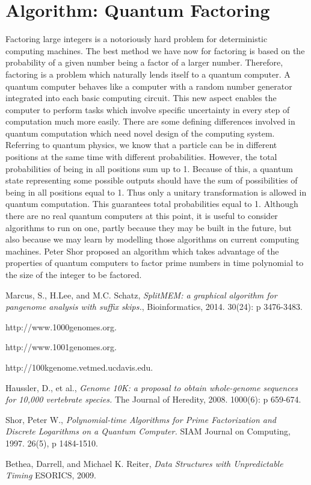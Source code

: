 \documentclass[11pt]{article}
\begin{document}
\section{Algorithm: Quantum Factoring}
Factoring large  integers is a notoriously hard problem for deterministic 
computing machines. The best method we have now  for factoring is based 
on the probability of a given number being a factor of a larger number. 
Therefore, factoring is a problem which naturally lends itself to a
quantum computer. A quantum computer behaves like a computer with a 
random number generator integrated into each basic computing circuit.
This new aspect enables the computer to perform tasks which involve 
specific uncertainty in every step of computation much more easily.
There are some defining differences involved in quantum computation
which need novel design of the computing system. Referring to quantum
physics, we know that a particle can be in 
different positions at the same time with different probabilities. 
However, the total probabilities of being in all positions sum up to 1. 
Because of this, a quantum state representing some possible outputs
should have the sum of possibilities of being in all positions equal to
1. Thus only a unitary transformation is allowed in quantum computation.
This guarantees total probabilities equal to 1. Although there are no
real quantum computers at this point, it is useful to consider algorithms
to run on one, partly because they may be built in the future, but also
because we may learn by modelling those algorithms on current computing machines.
Peter Shor proposed an algorithm which takes advantage of the properties
of quantum computers to factor prime numbers in time polynomial to the
size of the integer to be factored\cite{Shor97}.

\pagebreak

\begin{thebibliography}{9}

  Marcus, S., H.Lee, and M.C. Schatz,
  \emph{SplitMEM: a graphical algorithm for pangenome analysis with suffix skips.},
  Bioinformatics,
  2014. 30(24): p 3476-3483.
  
	http://www.1000genomes.org.
	
	http://www.1001genomes.org.
	
	http://100kgenome.vetmed.ucdavis.edu.
	
	Haussler, D., et al.,
	\emph{Genome 10K: a proposal to obtain whole-genome sequences for 10,000 vertebrate species.}
	The Journal of Heredity,
	2008. 1000(6): p 659-674.
	
	Shor, Peter W.,
	\emph{Polynomial-time Algorithms for Prime Factorization and Discrete Logarithms on a Quantum Computer.}
	SIAM Journal on Computing,
	1997. 26(5), p 1484-1510.
	
	Bethea, Darrell, and Michael K. Reiter,
	\emph{Data Structures with Unpredictable Timing}
	ESORICS,
	2009.
	
\end{thebibliography}
\end{document}
